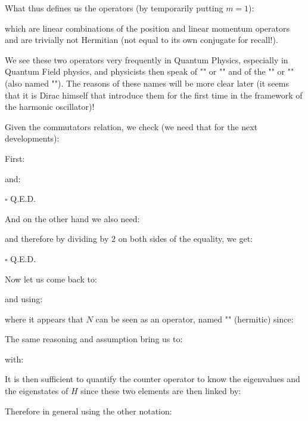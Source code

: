 	What thus defines us the operators (by temporarily putting $m=1$):
	
	which are linear combinations of the position and linear momentum operators and are trivially not Hermitian (not equal to its own conjugate for recall!).
	
	We see these two operators very frequently in Quantum Physics, especially in Quantum Field physics, and physicists then speak of "" or "" and of the "" or "" (also named ""). The reasons of these names will be more clear later (it seems that it is Dirac himself that introduce them for the first time in the framework of the harmonic oscillator)!

	Given the commutators relation, we check (we need that for the next developments):
	
	\begin{dem}
	First:
	
	and:
	
	\begin{flushright}
		$\square$  Q.E.D.
	\end{flushright}
	\end{dem}
	And on the other hand we also need:
	
	\begin{dem}
	
	and therefore by dividing by $2$ on both sides of the equality, we get:
	
	\begin{flushright}
		$\square$  Q.E.D.
	\end{flushright}
	\end{dem}
	Now let us come back to:
	
	and using:
	
	where it appears that $N$ can be seen as an operator, named "" (hermitic) since:
	
	The same reasoning and assumption bring us to:
	
	with:
	
	It is then sufficient to quantify the counter operator to know the eigenvalues and the eigenstates of $H$ since these two elements are then linked by:
	
	Therefore in general using the other notation:
	
